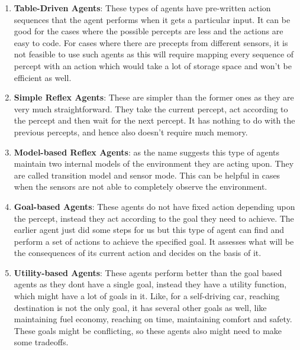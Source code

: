 \documentclass{article}
\begin{document}
  \begin{enumerate}
    \item \textbf{Table-Driven Agents}: These types of agents have pre-written action sequences that the agent performs when it gets a particular input. It can be good for the cases where the possible percepts are less and the actions are easy to code. For cases where there are precepts from different sensors, it is not feasible to use such agents as this will require mapping every sequence of percept with an action which would take a lot of storage space and won't be efficient as well.
    \item \textbf{Simple Reflex Agents}: These are simpler than the former ones as they are very much straightforward. They take the current percept, act according to the percept and then wait for the next percept. It has nothing to do with the previous percepts, and hence also doesn't require much memory. 
    \item \textbf{Model-based Reflex Agents}: as the name suggests this type of agents maintain two internal models of the environment they are acting upon. They are called transition model and sensor mode. This can be helpful in cases when the sensors are not able to completely observe the environment.
    \item \textbf{Goal-based Agents}: These agents do not have fixed action depending upon the percept, instead they act according to the goal they need to achieve. The earlier agent just did some steps for us but this type of agent can find and perform a set of actions to achieve the specified goal. It assesses what will be the consequences of its current action and decides on the basis of it.
    \item \textbf{Utility-based Agents}: These agents perform better than the goal based agents as they dont have a single goal, instead they have a utility function, which might have a lot of goals in it. Like, for a self-driving car, reaching destination is not the only goal, it has several other goals as well, like maintaining fuel economy, reaching on time, maintaining comfort and safety. These goals might be conflicting, so these agents also might need to make some tradeoffs.
  \end{enumerate}
\end{document}
